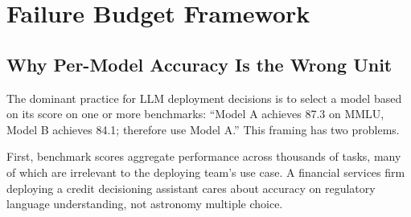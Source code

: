 \documentclass{article}
\begin{document}
\begin{table}[t]
\caption{Training-time evaluation blindness: four case studies.
All four are invisible to standard training measurement sets
($\mathcal{M}_{\text{train}} = \{$loss, reward, benchmark$\}$).}
\label{tab:training_blindness}
\centering
\small
{}
\end{table}

\section{Failure Budget Framework}
\label{sec:budget}

\subsection{Why Per-Model Accuracy Is the Wrong Unit}

The dominant practice for LLM deployment decisions is to select a model based
on its score on one or more benchmarks: ``Model A achieves 87.3 on MMLU, Model B
achieves 84.1; therefore use Model A.''  This framing has two problems.

First, benchmark scores aggregate performance across thousands of tasks, many
of which are irrelevant to the deploying team's use case.  A financial services
firm deploying a credit decisioning assistant cares about accuracy on regulatory
language understanding, not astronomy multiple choice.
\end{document}
